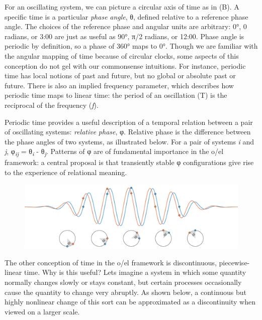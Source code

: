   For an oscillating system, we can picture a circular axis of time as in (B). A specific time is a particular \textit{phase} \textit{angle}, θ, defined relative to a reference phase angle. The choices of the reference phase and angular units are arbitrary: 0°, 0 radians, or 3:00 are just as useful as 90°, π/2 radians, or 12:00. Phase angle is periodic by definition, so a phase of 360° maps to 0°. Though we are familiar with the angular mapping of time because of circular clocks, some aspects of this conception do not gel with our commonsense intuitions. For instance, periodic time has local notions of past and future, but no global or absolute past or future. There is also an implied frequency parameter, which describes how periodic time maps to linear time: the period of an oscillation (T) is the reciprocal of the frequency (\textit{f}).

  Periodic time provides a useful description of a temporal relation between a pair of oscillating systems: \textit{relative} \textit{phase}, φ. Relative phase is the difference between the phase angles of two systems, as illustrated below. For a pair of systems \textit{i} and \textit{j}, φ\textit{\textsubscript{ij}}\textsubscript{} = θ\textit{\textsubscript{i}} - θ\textit{\textsubscript{j}}. Patterns of φ are of fundamental importance in the o/el framework: a central proposal is that transiently stable φ configurations give rise to the experience of relational meaning.  

  
\begin{figure}
\includegraphics[width=\textwidth]{figures/Tilsen-img3.png}
\caption{\missingcaption}
\label{fig:}
\end{figure}
 

  The other conception of time in the o/el framework is discontinuous, piecewise-linear time. Why is this useful? Lets imagine a system in which some quantity normally changes slowly or stays constant, but certain processes occasionally cause the quantity to change very abruptly. As shown below, a continuous but highly nonlinear change of this sort can be approximated as a discontinuity when viewed on a larger scale.

